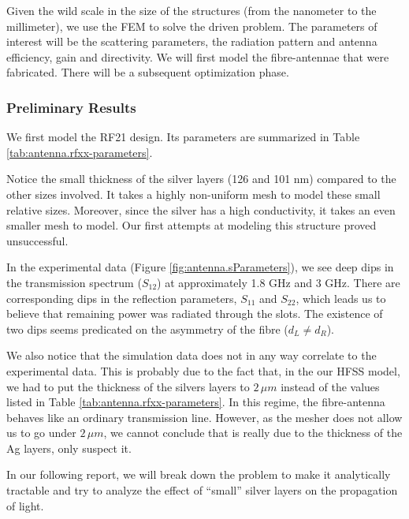 Given the wild scale in the size of the structures (from the nanometer to the millimeter), we use
the FEM to solve the driven problem. The parameters of interest will be the scattering parameters, the
radiation pattern and antenna efficiency, gain and directivity. We will first model the fibre-antennae
that were fabricated. There will be a subsequent optimization phase.

\subsubsection{Preliminary Results}
We first model the RF21 design. Its parameters are summarized in 
Table \ref{tab:antenna.rfxx-parameters}. 

Notice the small thickness
of the silver layers (126 and 101 nm) compared to the other 
sizes involved. It takes a highly non-uniform mesh to model
these small relative sizes. Moreover, since the silver has a high
conductivity, it takes an even smaller mesh to model. Our first 
attempts at modeling this structure proved unsuccessful.

In the experimental data (\see Figure \ref{fig:antenna.sParameters}), 
we see deep dips in the transmission spectrum ($S_{12}$) at approximately
1.8 GHz and 3 GHz. There are corresponding dips in the reflection parameters,
$S_{11}$ and $S_{22}$, which leads us to believe that remaining power 
was radiated through the slots. The existence of two dips seems predicated on the asymmetry
of the fibre ($d_L\neq d_R$). 

We also notice that the simulation data does not in any way correlate
to the experimental data. This is probably due to the fact that, in the our
HFSS model, we had to put the thickness of the silvers layers to $2\,\unit{\mu m}$
instead of the values listed in Table \ref{tab:antenna.rfxx-parameters}. In 
this regime, the fibre-antenna behaves like an ordinary transmission line. 
However, as the mesher does not allow us to go under $2\,\unit{\mu m}$, we cannot
conclude that is really due to the thickness of the Ag layers, only suspect it.

In our following report, we will break down the problem
to make it analytically tractable and try to analyze the effect of ``small''
silver layers on the propagation of light. 


